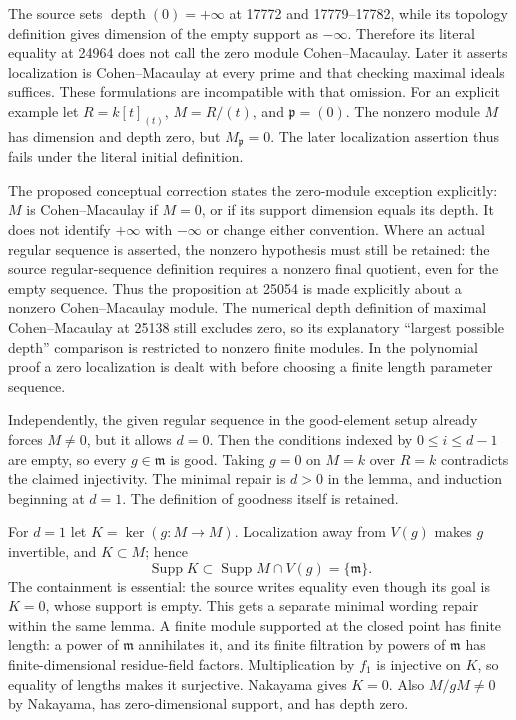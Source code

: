 The source sets \(\operatorname{depth}(0)=+\infty\) at 17772 and 17779--17782, while its topology definition gives dimension of the empty support as \(-\infty\). Therefore its literal equality at 24964 does not call the zero module Cohen--Macaulay. Later it asserts localization is Cohen--Macaulay at every prime and that checking maximal ideals suffices. These formulations are incompatible with that omission. For an explicit example let \(R=k[t]_{(t)}\), \(M=R/(t)\), and \(\mathfrak p=(0)\). The nonzero module \(M\) has dimension and depth zero, but \(M_{\mathfrak p}=0\). The later localization assertion thus fails under the literal initial definition.

The proposed conceptual correction states the zero-module exception explicitly: \(M\) is Cohen--Macaulay if \(M=0\), or if its support dimension equals its depth. It does not identify \(+\infty\) with \(-\infty\) or change either convention. Where an actual regular sequence is asserted, the nonzero hypothesis must still be retained: the source regular-sequence definition requires a nonzero final quotient, even for the empty sequence. Thus the proposition at 25054 is made explicitly about a nonzero Cohen--Macaulay module. The numerical depth definition of maximal Cohen--Macaulay at 25138 still excludes zero, so its explanatory ``largest possible depth'' comparison is restricted to nonzero finite modules. In the polynomial proof a zero localization is dealt with before choosing a finite length parameter sequence.

Independently, the given regular sequence in the good-element setup already forces \(M\ne0\), but it allows \(d=0\). Then the conditions indexed by \(0\le i\le d-1\) are empty, so every \(g\in\mathfrak m\) is good. Taking \(g=0\) on \(M=k\) over \(R=k\) contradicts the claimed injectivity. The minimal repair is \(d>0\) in the lemma, and induction beginning at \(d=1\). The definition of goodness itself is retained.

For \(d=1\) let \(K=\ker(g:M\to M)\). Localization away from \(V(g)\) makes \(g\) invertible, and \(K\subset M\); hence \[
 \operatorname{Supp}K\subset
 \operatorname{Supp}M\cap V(g)=\{\mathfrak m\}.
\] The containment is essential: the source writes equality even though its goal is \(K=0\), whose support is empty. This gets a separate minimal wording repair within the same lemma. A finite module supported at the closed point has finite length: a power of \(\mathfrak m\) annihilates it, and its finite filtration by powers of \(\mathfrak m\) has finite-dimensional residue-field factors. Multiplication by \(f_1\) is injective on \(K\), so equality of lengths makes it surjective. Nakayama gives \(K=0\). Also \(M/gM\ne0\) by Nakayama, has zero-dimensional support, and has depth zero.

